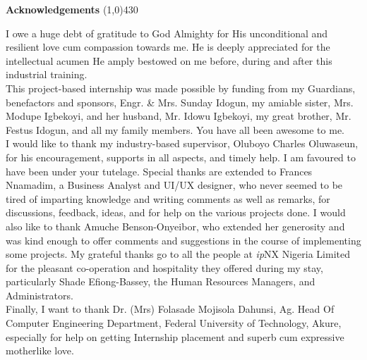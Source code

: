 \begin{center}
{\huge \bf Acknowledgements}
\line(1,0){430}
\end{center}



I owe a huge debt of gratitude to God Almighty for His unconditional and resilient love cum compassion towards me. He is deeply appreciated for the intellectual acumen He amply bestowed on me before, during and after this industrial training.\\

This project-based internship was made possible by funding from my Guardians, benefactors and sponsors, Engr. \& Mrs. Sunday Idogun, my amiable sister, Mrs. Modupe Igbekoyi, and her husband, Mr. Idowu Igbekoyi, my great brother, Mr. Festus Idogun, and all my family members. You have all been awesome to me.\\

I would like to thank my industry-based supervisor, Oluboyo Charles Oluwaseun, for his encouragement, supports in all aspects, and timely help. I am favoured to have been under your tutelage. Special thanks are extended to Frances Nnamadim, a Business Analyst and UI/UX designer, who never seemed to be tired of imparting knowledge and writing comments as well as remarks, for discussions, feedback, ideas, and for help on the various projects done. I would also like to thank Amuche Benson-Onyeibor, who extended her generosity and was kind enough to offer
comments and suggestions in the course of implementing some projects. My grateful thanks go to all the people at \textit{ip}NX Nigeria Limited for the pleasant co-operation and hospitality they offered during my stay, particularly Shade Efiong-Bassey, the Human Resources Managers, and Administrators.\\

Finally, I want to thank Dr. (Mrs) Folasade Mojisola Dahunsi,  Ag. Head Of Computer Engineering Department, Federal University of Technology, Akure, especially for help on getting Internship placement and superb cum expressive motherlike love.

\clearpage